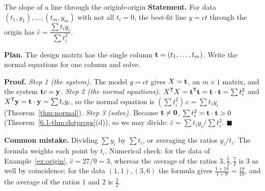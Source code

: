 \documentclass[11pt]{article}
\begin{document}
\begin{exmp}{The slope of a line through the origin}{b-origin}
\textbf{Statement.} For data $(t_1,y_1),\dots,(t_m,y_m)$ with not all $t_i=0$, the best-fit line $y=ct$ through the origin has $\hat{c}=\dfrac{\sum t_iy_i}{\sum t_i^2}$.

\textbf{Plan.} The design matrix has the single column $\mathbf{t}=(t_1,\dots,t_m)$. Write the normal equations for one column and solve.

\textbf{Proof.}
\emph{Step 1 (the system).} The model $y=ct$ gives $X=\mathbf{t}$, an $m\times1$ matrix, and the system $\mathbf{t}c=\mathbf{y}$.
\emph{Step 2 (the normal equations).} $X^{\mathsf T} X=\mathbf{t}^{\mathsf T}\mathbf{t}=\mathbf{t}\cdot\mathbf{t}=\sum t_i^2$ and $X^{\mathsf T}\mathbf{y}=\mathbf{t}\cdot\mathbf{y}=\sum t_iy_i$, so the normal equation is $(\sum t_i^2)\,c=\sum t_iy_i$ (Theorem~\ref{thm:normal}).
\emph{Step 3 (solve).} Because $\mathbf{t}\neq\mathbf{0}$, $\sum t_i^2=\mathbf{t}\cdot\mathbf{t}>0$ (Theorem~\ref{6.1-thm:dotprops}(d)), so we may divide: $\hat{c}=\sum t_iy_i/\sum t_i^2$. \qquad$\blacksquare$

\textbf{Common mistake.} Dividing $\sum y_i$ by $\sum t_i$, or averaging the ratios $y_i/t_i$. The formula weights each point by $t_i$. Numerical check: for the data of Example~\ref{ex:origin}, $\hat{c}=27/9=3$, whereas the average of the ratios $3,\tfrac52,\tfrac72$ is $3$ as well by coincidence; for the data $(1,1),(3,6)$ the formula gives $\tfrac{1+18}{1+9}=\tfrac{19}{10}$, and the average of the ratios $1$ and $2$ is $\tfrac32$.
\end{exmp}
\end{document}
